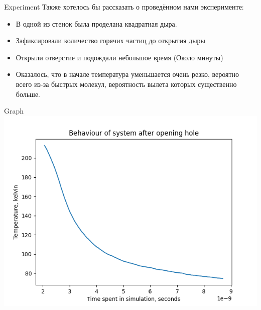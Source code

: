 \documentclass{beamer}
\begin{document}
\begin{frame}{Experiment}
  Также хотелось бы рассказать о проведённом нами эксперименте:
  \begin{itemize}
    \item<1-> В одной из стенок была проделана квадратная дыра.
    \item<2-> Зафиксировали количество горячих частиц до открытия дыры
    \item<3-> Открыли отверстие и подождали небольшое время (Около минуты)
    \item<4-> Оказалось, что в начале температура уменьшается очень резко, вероятно всего из-за быстрых молекул, вероятность вылета которых существенно больше.
  \end{itemize}
\end{frame}

\begin{frame}{Graph}
  \includegraphics[scale=0.5]{holettime.png}
\end{frame}
\end{document}
